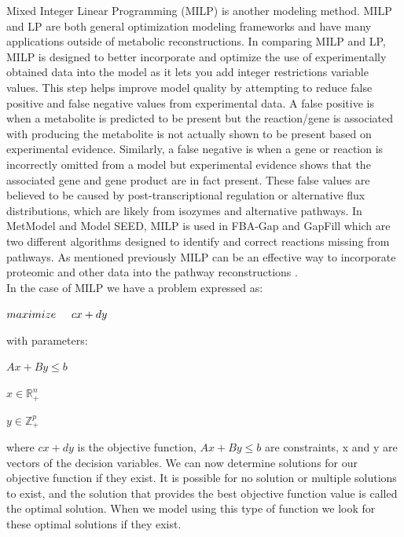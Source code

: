 \indent\indent Mixed Integer Linear Programming (MILP) is another modeling method.  MILP and LP are both general optimization modeling frameworks and have many applications outside of metabolic reconstructions. In comparing MILP  and LP, MILP is designed to better incorporate and optimize the use of experimentally obtained data into the model as it lets you add integer restrictions variable values\citep{bordbar_constraint-based_2014}. This step helps improve model quality by attempting to reduce false positive and false negative values from experimental data\citep{vanee_high_2013}. A false positive is when a metabolite is predicted to be present but the reaction/gene is associated with producing the metabolite is not actually shown to be present based on experimental evidence. Similarly, a false negative is when a gene or reaction is incorrectly omitted from a model but experimental evidence shows that the associated gene and gene product are in fact present. These false values are believed to be caused by post-transcriptional regulation or alternative flux distributions, which are likely from isozymes and alternative pathways.  In MetModel and Model SEED, MILP is used in FBA-Gap and GapFill which are two different algorithms designed to identify and correct reactions missing from pathways. As mentioned previously MILP can be an effective way to incorporate proteomic and other data into the pathway reconstructions \citep{shlomi_network-based_2008}.\\
%
%
%
\indent  In the case of MILP we have a problem expressed as: 
%
%
%
\begin{center} $maximize \hspace{0.5cm} cx + dy$ \end{center}
with parameters:
\begin{center}
$Ax+By \leq b$

$x \in \mathbb{R}_{+}^n$

$y \in \mathbb{Z}_{+}^p$\end{center}
where $cx + dy$ is the objective function, $Ax+By \leq b$ are constraints, x and y are vectors of the decision variables\citep{brooks_solving_2005}.  We can now determine solutions for our objective function if they exist. It is possible for no solution or multiple solutions to exist, and the solution that provides the best objective function value is called the optimal solution.  When we model using this type of function we look for these optimal solutions if they exist.\\


